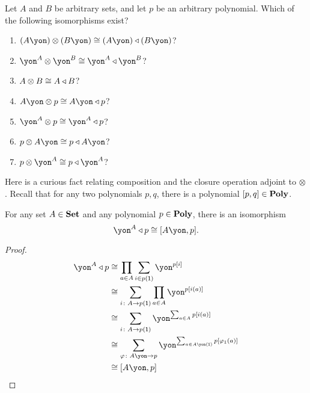 \documentclass[Book-Poly]{subfiles}
\begin{document}
\begin{exercise}
Let $A$ and $B$ be arbitrary sets, and let $p$ be an arbitrary polynomial. Which of the following isomorphisms exist?
\begin{enumerate}
	\item $(A\yon)\otimes(B\yon) \cong (A\yon)\tri (B\yon)$?
	\item $\yon^A\otimes\yon^B\cong\yon^A\tri\yon^B$?
	\item $A\otimes B\cong A\mathbin{\triangleleft} B$?
	\item $A\yon\otimes p\cong A\yon\tri p$?
	\item $\yon^A\otimes p\cong \yon^A\tri p$?
	\item $p\otimes A\yon\cong p\tri A\yon$?
	\item $p\otimes \yon^A\cong p\tri\yon^A$?
\qedhere
\end{enumerate}
\end{exercise}

Here is a curious fact relating composition and the closure operation adjoint to $\otimes$. Recall that for any two polynomials $p,q$, there is a polynomial $[p,q]\in\mathbf{Poly}$.
 
\begin{proposition}
For any set $A\in\mathbf{Set}$ and any polynomial $p\in\mathbf{Poly}$, there is an isomorphism
\[
\yon^A\tri p\cong[A\yon,p].
\]
\end{proposition}
\begin{proof}
\begin{align*}
	\yon^A\tri p&\cong
	\prod_{a\in A}\sum_{i\in p(\1)}\yon^{p[i]}\\&\cong
	\sum_{i\colon A\to p(\1)}\prod_{a\in A}\yon^{p[i(a)]}\\&\cong
	\sum_{i\colon A\to p(\1)}\yon^{\sum_{a\in A}p[i(a)]}\\&\cong
	\sum_{\varphi\colon A\yon\to p}\yon^{\sum_{a\in A\yon(\1)}
	p[\varphi_1(a)]}\\&\cong
	[A\yon,p]
\end{align*}
\end{proof}
\end{document}
